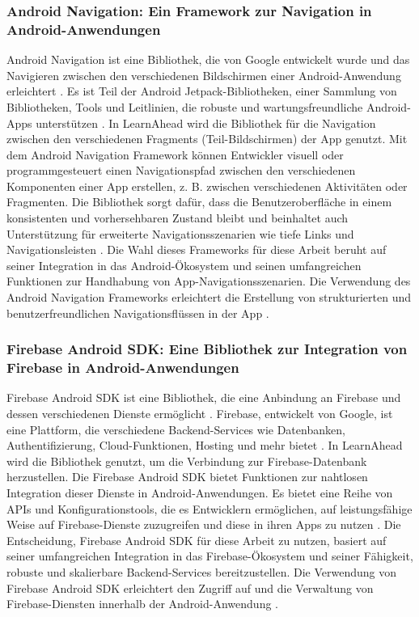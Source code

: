 \subsubsection{Android Navigation: Ein Framework zur Navigation in Android-Anwendungen}
Android Navigation ist eine Bibliothek, die von Google entwickelt wurde und das Navigieren zwischen den verschiedenen Bildschirmen einer Android-Anwendung erleichtert \cite{AndroidNav2022}. Es ist Teil der Android Jetpack-Bibliotheken, einer Sammlung von Bibliotheken, Tools und Leitlinien, die robuste und wartungsfreundliche Android-Apps unterstützen \cite{AndroidJetpack2022}. \newline
In LearnAhead wird die Bibliothek für die Navigation zwischen den verschiedenen Fragments (Teil-Bildschirmen) der App genutzt. Mit dem Android Navigation Framework können Entwickler visuell oder programmgesteuert einen Navigationspfad zwischen den verschiedenen Komponenten einer App erstellen, z. B. zwischen verschiedenen Aktivitäten oder Fragmenten. Die Bibliothek sorgt dafür, dass die Benutzeroberfläche in einem konsistenten und vorhersehbaren Zustand bleibt und beinhaltet auch Unterstützung für erweiterte Navigationsszenarien wie tiefe Links und Navigationsleisten \cite{AndroidNav2022}. \newline
Die Wahl dieses Frameworks für diese Arbeit beruht auf seiner Integration in das Android-Ökosystem und seinen umfangreichen Funktionen zur Handhabung von App-Navigationsszenarien. Die Verwendung des Android Navigation Frameworks erleichtert die Erstellung von strukturierten und benutzerfreundlichen Navigationsflüssen in der App \cite{AndroidNav2022}. \newline
\subsubsection{Firebase Android SDK: Eine Bibliothek zur Integration von Firebase in Android-Anwendungen}
Firebase Android SDK ist eine Bibliothek, die eine Anbindung an Firebase und dessen verschiedenen Dienste ermöglicht \cite{FirebaseSDK2022}. Firebase, entwickelt von Google, ist eine Plattform, die verschiedene Backend-Services wie Datenbanken, Authentifizierung, Cloud-Funktionen, Hosting und mehr bietet \cite{Firebase2022}. \newline
In LearnAhead wird die Bibliothek genutzt, um die Verbindung zur Firebase-Datenbank herzustellen. Die Firebase Android SDK bietet Funktionen zur nahtlosen Integration dieser Dienste in Android-Anwendungen. Es bietet eine Reihe von APIs und Konfigurationstools, die es Entwicklern ermöglichen, auf leistungsfähige Weise auf Firebase-Dienste zuzugreifen und diese in ihren Apps zu nutzen \cite{FirebaseSDK2022}. \newline
Die Entscheidung, Firebase Android SDK für diese Arbeit zu nutzen, basiert auf seiner umfangreichen Integration in das Firebase-Ökosystem und seiner Fähigkeit, robuste und skalierbare Backend-Services bereitzustellen. Die Verwendung von Firebase Android SDK erleichtert den Zugriff auf und die Verwaltung von Firebase-Diensten innerhalb der Android-Anwendung \cite{FirebaseSDK2022}. \newline

